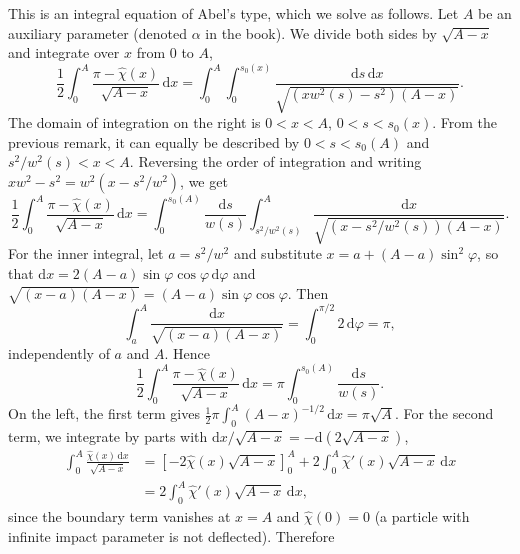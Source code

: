 \begin{problem}[title={Repulsive field from cross-section (Firsov)}]
{This is an integral equation of Abel's type, which we solve as follows. Let $A$ be an auxiliary parameter (denoted $\alpha$ in the book). We divide both sides by $\sqrt{A - x}$ and integrate over $x$ from $0$ to $A$,
\begin{equation*}
    \frac{1}{2}\int_0^A \frac{\pi - \widehat{\chi}(x)}{\sqrt{A - x}}\,\mathrm{d}x = \int_0^A \int_0^{s_0(x)} \frac{\mathrm{d}s\,\mathrm{d}x}{\sqrt{\left( xw^2(s) - s^2 \right)(A - x)}}.
\end{equation*}
The domain of integration on the right is $0 < x < A$, $0 < s < s_0(x)$. From the previous remark, it can equally be described by $0 < s < s_0(A)$ and $s^2/w^2(s) < x < A$. Reversing the order of integration and writing $xw^2 - s^2 = w^2(x - s^2/w^2)$, we get
\begin{equation*}
    \frac{1}{2}\int_0^A \frac{\pi - \widehat{\chi}(x)}{\sqrt{A - x}}\,\mathrm{d}x = \int_0^{s_0(A)} \frac{\mathrm{d}s}{w(s)} \int_{s^2/w^2(s)}^A \frac{\mathrm{d}x}{\sqrt{\left( x - s^2/w^2(s) \right)(A - x)}}.
\end{equation*}
For the inner integral, let $a = s^2/w^2$ and substitute $x = a + (A - a)\sin^2{\varphi}$, so that $\mathrm{d}x = 2(A - a)\sin{\varphi}\cos{\varphi}\,\mathrm{d}\varphi$ and $\sqrt{(x - a)(A - x)} = (A - a)\sin{\varphi}\cos{\varphi}$. Then
\begin{equation*}
    \int_a^A \frac{\mathrm{d}x}{\sqrt{(x - a)(A - x)}} = \int_0^{\pi/2} 2\,\mathrm{d}\varphi = \pi,
\end{equation*}
independently of $a$ and $A$. Hence
\begin{equation*}
    \frac{1}{2}\int_0^A \frac{\pi - \widehat{\chi}(x)}{\sqrt{A - x}}\,\mathrm{d}x = \pi\int_0^{s_0(A)} \frac{\mathrm{d}s}{w(s)}.
\end{equation*}
On the left, the first term gives $\frac{1}{2}\pi\int_0^A (A - x)^{-1/2}\,\mathrm{d}x = \pi\sqrt{A}$. For the second term, we integrate by parts with $\mathrm{d}x/\sqrt{A - x} = -\mathrm{d}\left( 2\sqrt{A - x} \right)$,
\begin{align*}
    \int_0^A \frac{\widehat{\chi}(x)\,\mathrm{d}x}{\sqrt{A - x}} &= \left[ -2\widehat{\chi}(x)\sqrt{A - x} \right]_0^A + 2\int_0^A \widehat{\chi}'(x)\sqrt{A - x}\,\mathrm{d}x \\
    &= 2\int_0^A \widehat{\chi}'(x)\sqrt{A - x}\,\mathrm{d}x,
\end{align*}
since the boundary term vanishes at $x = A$ and $\widehat{\chi}(0) = 0$ (a particle with infinite impact parameter is not deflected). Therefore
\begin{equation*}

\end{equation*}}
\end{problem}
